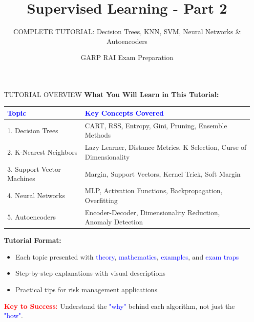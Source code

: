 \documentclass[8pt]{beamer}
\title{Supervised Learning - Part 2}
\subtitle{COMPLETE TUTORIAL: Decision Trees, KNN, SVM, Neural Networks \& Autoencoders}
\author{GARP RAI Exam Preparation}
\date{}
\begin{document}
	
	\begin{frame}
		\titlepage
	\end{frame}
	
	
	\begin{frame}{TUTORIAL OVERVIEW}
		\fontsize{7}{8}\selectfont
		\textbf{What You Will Learn in This Tutorial:}
		
		\vspace{0.2cm}
		\begin{tabular}{|p{2.5cm}|p{5.5cm}|}
			\hline
			\textcolor{blue}{Topic} & \textcolor{blue}{Key Concepts Covered} \\
			\hline
			1. Decision Trees & CART, RSS, Entropy, Gini, Pruning, Ensemble Methods \\
			\hline
			2. K-Nearest Neighbors & Lazy Learner, Distance Metrics, K Selection, Curse of Dimensionality \\
			\hline
			3. Support Vector Machines & Margin, Support Vectors, Kernel Trick, Soft Margin \\
			\hline
			4. Neural Networks & MLP, Activation Functions, Backpropagation, Overfitting \\
			\hline
			5. Autoencoders & Encoder-Decoder, Dimensionality Reduction, Anomaly Detection \\
			\hline
		\end{tabular}
		
		\vspace{0.2cm}
		\textbf{Tutorial Format:}
		\begin{itemize}
			\item Each topic presented with \textcolor{blue}{theory}, \textcolor{blue}{mathematics}, \textcolor{blue}{examples}, and \textcolor{blue}{exam traps}
			\item Step-by-step explanations with visual descriptions
			\item Practical tips for risk management applications
		\end{itemize}
		
		\textcolor{red}{\textbf{Key to Success:}} Understand the \textcolor{blue}{"why"} behind each algorithm, not just the \textcolor{blue}{"how"}.
	\end{frame}
	
	
\end{document}
